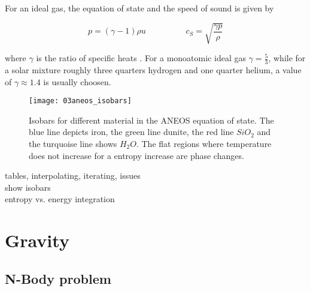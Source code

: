 For an ideal gas, the equation of state and the speed of sound is given by

\begin{equation}
\label{ch02_sph01_eq036}
p = ( \gamma - 1 ) \rho u \hspace{2cm} c_S = \sqrt{ \frac{\gamma p}{\rho} }
\end{equation}

where $\gamma$ is the ratio of specific heats . For a monoatomic ideal gas $\gamma = \frac{5}{3}$, while for a solar mixture roughly three quarters hydrogen and one quarter helium, a value of $\gamma \approx 1.4$ is usually choosen. 

\begin{figure}
\begin{center}
\texttt{[image: 03aneos\_isobars]}
\caption{Isobars for different material in the ANEOS equation of state. The blue line depicts iron, the green line dunite, the red line $SiO_2$ and the turquoise line shows $H_2 O$. The flat regions where temperature does not increase for a entropy increase are phase changes. }
\label{fig03walks}
\end{center}
\end{figure}




tables, interpolating, iterating, issues\\
show isobars\\
entropy vs. energy integration\\

\citep{Melosh:2007p3502}
\citep{Thompson:1990p1103}

\citep{Abel:2010p3297}
\citep{Barnes:1986p2853}
\citep{Monaghan:2005p2677}
\citep{Ott:2003p3727}
\citep{Price:2004p2613}
\citep{Solenthaler:2008p3720}
\citep{Springel:2003p3298}
\citep{Monaghan:1992ARAA..30..543M}

% 

\section{Gravity}

\subsection{N-Body problem}

